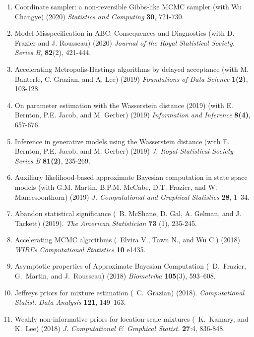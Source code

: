 \begin{enumerate}
\item Coordinate sampler: a non-reversible Gibbs-like MCMC sampler (with Wu
Changye) (2020) {\em Statistics and Computing} {\bf 30}, 721-730.

\item Model Misspecification in ABC: Consequences and Diagnostics (with D.
Frazier and J. Rousseau) (2020) {\em Journal of the Royal Statistical Society.
Series B}, {\bf 82}(2), 421-444.

\item Accelerating Metropolis-Hastings algorithms by delayed acceptance (with
M. Banterle, C. Grazian, and A. Lee) (2019)
{\em Foundations of Data Science} {\bf 1(2)}, 103-128.

\item On parameter estimation with the Wasserstein distance (2019)
(with E. Bernton, P.E. Jacob, and M. Gerber)  (2019) {\em Information and Inference} {\bf 8(4)}, 657-676.

\item Inference in generative models using the Wasserstein distance 
(with E. Bernton, P.E. Jacob, and M. Gerber)  (2019) {\em J. Royal Statistical Society Series B} {\bf 81(2)},
235-269.

\item Auxiliary likelihood-based approximate Bayesian computation in state space models
(with G.M. Martin, B.P.M. McCabe, D.T. Frazier, and W. Maneesoonthorn) (2019)
{\em J. Computational and Graphical Statistics} {\bf 28}, 1--34.

\item Abandon statistical significance (\avec~B. McShane, D. Gal, A. Gelman, and J. Tackett) (2019). {\em The American Statistician} {\bf 73} (1), 235-245.

\item Accelerating MCMC algorithms (\avec~Elvira V., Tawn N., and Wu C.) (2018) {\em WIREs Computational Statistics} {\bf 10} e1435.

\item Asymptotic properties of Approximate Bayesian Computation (\avec~D.~Frazier, G.~Martin, and J.~Rousseau)
(2018) {\em Biometrika} {\bf 105}(3), 593--608.

\item Jeffreys priors for mixture estimation (\avec~C.~Grazian) (2018).
{\em Computational Statist. Data Analysis} {\bf 121}, 149--163.

\item Weakly non-informative priors for location-scale mixtures (\avec~K.~Kamary, and K.~Lee) (2018) 
{\em J. Computational \&~Graphical Statist.} {\bf 27}:4, 836-848. %


\end{enumerate}
